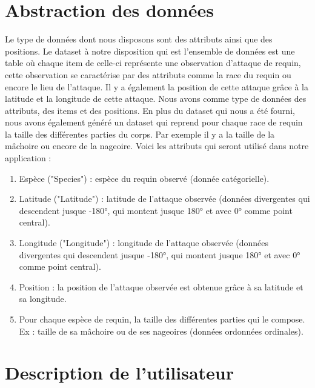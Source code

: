 \documentclass{article}
\begin{document}
\newpage
\section{Abstraction des données}

Le type de données dont nous disposons sont des attributs ainsi que des positions. Le dataset à notre disposition qui est l’ensemble de données est une table où chaque item de celle-ci représente une observation d’attaque de requin, cette observation se caractérise par des attributs comme la race du requin ou encore le lieu de l’attaque. Il y a également la position de cette attaque grâce à la latitude et la longitude de cette attaque. Nous avons comme type de données des attributs, des items et des positions. En plus du dataset qui nous a été fourni, nous avons également généré un dataset qui reprend pour chaque race de requin la taille des différentes parties du corps. Par exemple il y a la taille de la mâchoire ou encore de la nageoire. Voici les attributs qui seront utilisé dans notre application :

\begin{enumerate}
	\item Espèce ("Species") : espèce du requin observé (donnée catégorielle).
	\item Latitude ("Latitude") : latitude de l’attaque observée (données divergentes qui descendent jusque -\ang{180}, qui montent jusque \ang{180} et avec \ang{0} comme point central).
	\item Longitude ("Longitude") : longitude de l’attaque observée (données divergentes qui descendent jusque -\ang{180}, qui montent jusque \ang{180} et avec \ang{0} comme point central).
	\item Position : la position de l’attaque observée est obtenue grâce à sa latitude et sa longitude.
	\item Pour chaque espèce de requin, la taille des différentes parties qui le compose. Ex : taille de sa mâchoire ou de ses nageoires (données ordonnées ordinales).
\end{enumerate}

\newpage
\section{Description de l’utilisateur}
\end{document}

